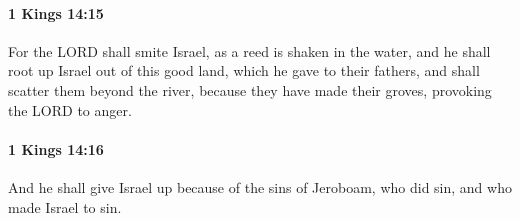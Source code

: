 		\paragraph{1 Kings 14:15} %
			\label{1KINGS-14-15}

			For the LORD shall smite Israel, as a reed is shaken in the water, and he shall root up Israel out of this good land, which he gave to their fathers, and shall scatter them beyond the river, because they have made their groves, provoking the LORD to anger.


		\paragraph{1 Kings 14:16} %
			\label{1KINGS-14-16}

			And he shall give Israel up because of the sins of Jeroboam, who did sin, and who made Israel to sin.


